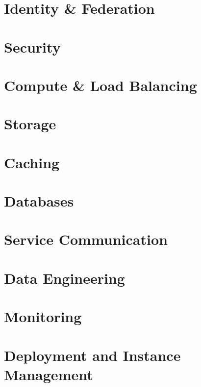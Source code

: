 \documentclass[11pt]{book}
\begin{document}
    \chapter{Identity \& Federation}
    


    \chapter{Security}
    
%


    \chapter{Compute \& Load Balancing}
    
%


    \chapter{Storage}
    


    \chapter{Caching}
    


    \chapter{Databases}
    


    \chapter{Service Communication}
    


    \chapter{Data Engineering}
    


    \chapter{Monitoring}
    


    \chapter{Deployment and Instance Management}
    
\end{document}
